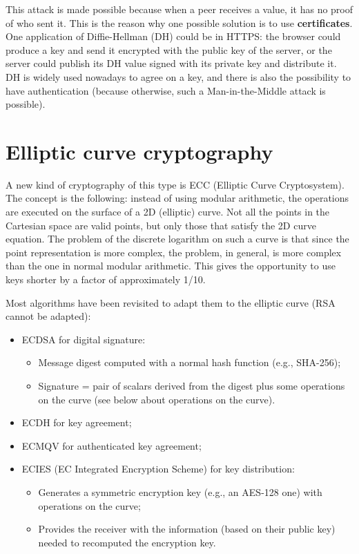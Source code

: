 This attack is made possible because when a peer receives a value, it has no proof of who sent it.
This is the reason why one possible solution is to use \textbf{certificates}. %
One application of Diffie-Hellman (DH) could be in HTTPS: the browser could produce a key and send it encrypted with the public key of the server, or the server could publish its DH value signed with its private key and distribute it.
DH is widely used nowadays to agree on a key, and there is also the possibility to have authentication (because otherwise, such a Man-in-the-Middle attack is possible).


\section{Elliptic curve cryptography}
A new kind of cryptography of this type is ECC (Elliptic Curve Cryptosystem). The concept is the following: instead of using modular arithmetic, the operations are executed on the surface of a 2D (elliptic) curve. Not all the points in the Cartesian space are valid points, but only those that satisfy the 2D curve equation. The problem of the discrete logarithm on such a curve is that since the point representation is more complex, the problem, in general, is more complex than the one in normal modular arithmetic. This gives the opportunity to use keys shorter by a factor of approximately 1/10.

Most algorithms have been revisited to adapt them to the elliptic curve (RSA cannot be adapted):
\begin{itemize}
	\item ECDSA for digital signature:
	      \begin{itemize}
		      \item Message digest computed with a normal hash function (e.g., SHA-256);
		      \item Signature = pair of scalars derived from the digest plus some operations on the curve (see below about operations on the curve).
	      \end{itemize}
	\item ECDH for key agreement;
	\item ECMQV for authenticated key agreement;
	\item ECIES (EC Integrated Encryption Scheme) for key distribution:
	      \begin{itemize}
		      \item Generates a symmetric encryption key (e.g., an AES-128 one) with operations on the curve;
		      \item Provides the receiver with the information (based on their public key) needed to recomputed the encryption key.
	      \end{itemize}
\end{itemize}


